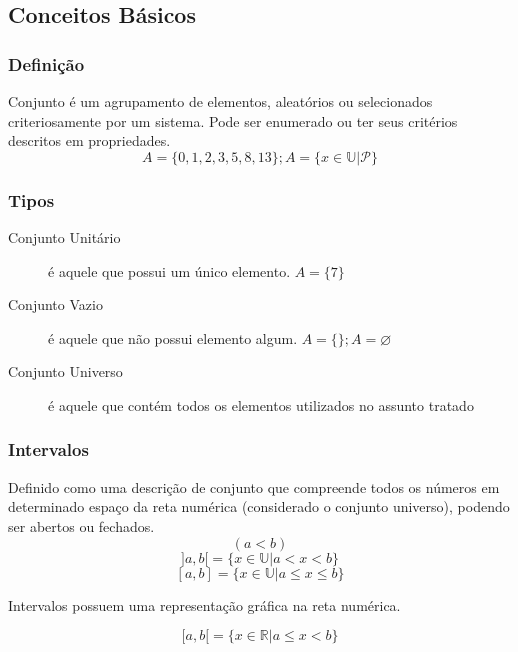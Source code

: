 \subsection{Conceitos Básicos}
    \subsubsection{Definição}
        Conjunto é um agrupamento de elementos, aleatórios ou selecionados criteriosamente por um sistema. Pode ser enumerado ou ter seus critérios descritos em propriedades. \eg
        \[ A = \{ 0,1,2,3,5,8,13 \}; A = \{ x \in \mathbb{U} | \mathcal{P} \} \]
    \subsubsection{Tipos}
        \begin{description}
            \item[Conjunto Unitário] é aquele que possui um único elemento. \eg \hfill $ A = \{7\} $
            \item[Conjunto Vazio] é aquele que não possui elemento algum. \eg \hfill $ A = \{  \}; A = \varnothing $
            \item[Conjunto Universo] é aquele que contém todos os elementos utilizados no assunto
tratado
        \end{description}
    \subsubsection{Intervalos}
        Definido como uma descrição de conjunto que compreende todos os números em determinado espaço da reta numérica (considerado o conjunto universo), podendo ser abertos ou fechados. \eg
        \[ (a<b) \]
        \[ ]a,b[ = \{ x \in \mathbb{U} | a < x < b \} \]
        \[ [a,b] = \{ x \in \mathbb{U} | a \leq x \leq b \} \]
        
        Intervalos possuem uma representação gráfica na reta numérica. \eg
        \begin{center}
            \[ [a,b[ = \{ x \in \mathbb{R} | a \leq x < b \} \]
        \end{center}

